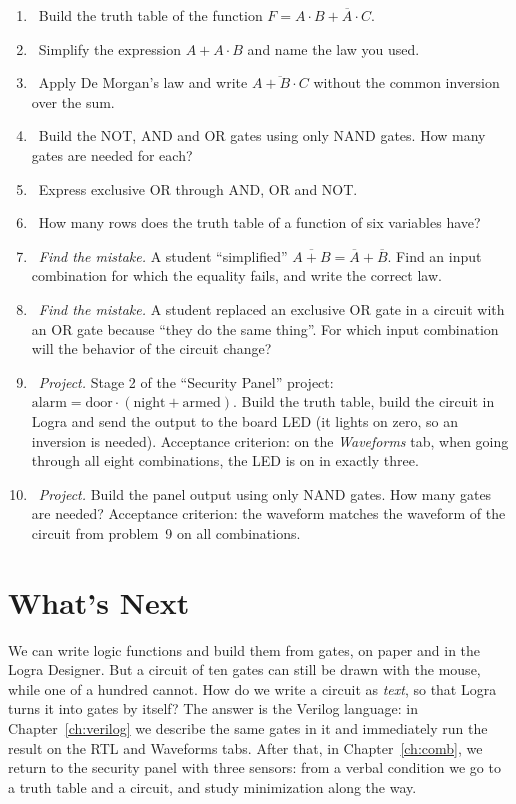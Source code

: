 \begin{taskbox}
\begin{enumerate}
  \item {}~Build the truth table of the function $F = A\cdot B + \overline{A}\cdot C$.
  \item {}~Simplify the expression $A + A\cdot B$ and name the law you used.
  \item {}~Apply De Morgan's law and write $\overline{A + B\cdot C}$ without the common inversion over the sum.
  \item {}~Build the NOT, AND and OR gates using only NAND gates. How many gates are needed for each?
  \item {}~Express exclusive OR through AND, OR and NOT.
  \item {}~How many rows does the truth table of a function of six variables have?
  \item {}~\emph{Find the mistake.} A student ``simplified'' $\overline{A+B}=\overline{A}+\overline{B}$. Find an input combination for which the equality fails, and write the correct law.
  \item {}~\emph{Find the mistake.} A student replaced an exclusive OR gate in a circuit with an OR gate because ``they do the same thing''. For which input combination will the behavior of the circuit change?
  \item {}~\emph{Project.} Stage 2 of the ``Security Panel'' project: $\text{alarm}=\text{door}\cdot(\text{night}+\text{armed})$. Build the truth table, build the circuit in Logra and send the output to the board LED (it lights on zero, so an inversion is needed). Acceptance criterion: on the \emph{Waveforms} tab, when going through all eight combinations, the LED is on in exactly three.
  \item {}~\emph{Project.} Build the panel output  using only NAND gates. How many gates are needed? Acceptance criterion: the waveform matches the waveform of the circuit from problem~9 on all combinations.
\end{enumerate}
\end{taskbox}

\section{What's Next}

We can write logic functions and build them from gates, on paper and in the
Logra Designer. But a circuit of ten gates can still be drawn with the mouse,
while one of a hundred cannot. How do we write a circuit as \emph{text}, so that
Logra turns it into gates by itself? The answer is the Verilog language: in
Chapter~\ref{ch:verilog} we describe the same gates in it and immediately run
the result on the RTL and Waveforms tabs. After that, in Chapter~\ref{ch:comb},
we return to the security panel with three sensors: from a verbal condition we
go to a truth table and a circuit, and study minimization along the way.
